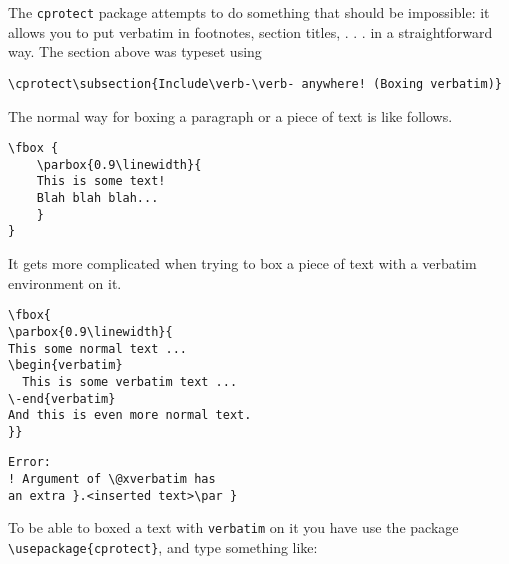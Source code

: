 \documentclass[12pt,a4paper]{article}
\theoremstyle{definition}
\theoremstyle{remark}
\newcommand{\bs}{\bigskip}
\newcommand{\tbs}{\textbackslash}
\begin{document}
The \texttt{cprotect} package attempts to do something that should be impossible: it allows you
to put verbatim in footnotes, section titles, . . . in a straightforward way. The section above was typeset using

\begin{verbatim}
\cprotect\subsection{Include\verb-\verb- anywhere! (Boxing verbatim)}
\end{verbatim}

The normal way for boxing a paragraph or a piece of text is like follows.
\bs

\begin{minipage}{0.45\textwidth}
\begin{verbatim}
\fbox {
    \parbox{0.9\linewidth}{
    This is some text!
    Blah blah blah...
    }
}
\end{verbatim}
\end{minipage}
\hfill\vline\hfill
\begin{minipage}[c]{0.3\textwidth}
\end{minipage}
\bs

It gets more complicated when trying to box a piece of text with a verbatim environment on it.
\bigskip 

\begin{minipage}{0.55\textwidth}
\begin{verbatim}
\fbox{
\parbox{0.9\linewidth}{
This some normal text ...
\begin{verbatim}
  This is some verbatim text ...
\-end{verbatim}
And this is even more normal text.
}}
\end{verbatim}
\end{minipage}
\vline\hfill
\begin{minipage}[c]{0.35\textwidth}
\begin{verbatim}
Error:
! Argument of \@xverbatim has
an extra }.<inserted text>\par }
\end{verbatim}
\end{minipage}
\bigskip

To be able to boxed a text with \texttt{verbatim} on it you have
use the package \texttt{\tbs usepackage\{cprotect\}}, and type something like: \bs
\end{document}

